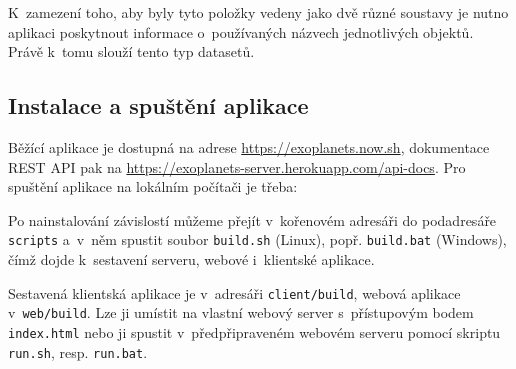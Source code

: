 \documentclass[a4paper,12pt]{article}
\def\code#1{\texttt{#1}}
\begin{document}
{{{{{{{{{K~zamezení toho, aby byly tyto položky vedeny jako dvě různé soustavy je nutno aplikaci poskytnout informace o~používaných názvech jednotlivých objektů. Právě k~tomu slouží tento typ datasetů.

\subsection{Instalace a spuštění aplikace}

Běžící aplikace je dostupná na adrese \url{https://exoplanets.now.sh}, dokumentace REST API pak na \url{https://exoplanets-server.herokuapp.com/api-docs}. Pro spuštění aplikace na lokálním počítači je třeba:

{

Po nainstalování závislostí můžeme přejít v~kořenovém adresáři do podadresáře \code{scripts} a~v~něm spustit soubor \code{build.sh} (Linux), popř. \code{build.bat} (Windows), čímž dojde k~sestavení serveru, webové i~klientské aplikace.



Sestavená klientská aplikace je v~adresáři \code{client/build}, webová aplikace v~\code{web/build}. Lze ji umístit na  vlastní webový server s~přístupovým bodem \code{index.html} nebo ji spustit v~předpřipraveném webovém serveru pomocí skriptu \code{run.sh}, resp. \code{run.bat}.

{

}}}}}}}}}}}
\end{document}
